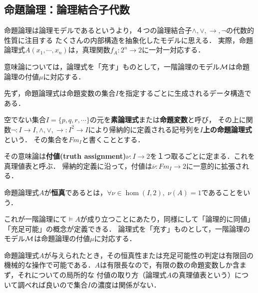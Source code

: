 \documentclass[uplatex, 12pt, dvipdfmx]{jsreport}
\begin{document}
\subsection{命題論理：論理結合子代数}

\begin{screen}
命題論理は論理モデルであるというより，４つの論理結合子$\land,\lor,\to,\lnot$の代数的性質に注目する
たくさんの内部構造を抽象化したモデルに思える．
実際，命題論理式$A(x_1,\cdots,x_n)$は，真理関数$f_A:2^n\to 2$に一対一対応する．

意味論については，論理式を「充す」ものとして，一階論理のモデル$\mathcal{M}$は命題論理の付値$\mu$に対応する．
\end{screen}

先ず，命題論理式は命題変数の集合$I$を指定するごとに生成されるデータ構造である．
\begin{definition}
    空でない集合$I=\{p,q,r,\cdots\}$の元を\textbf{素論理式}または\textbf{命題変数}と呼び，
    その上に関数$\lnot:I\to I,\land,\lor,\to:I^2\to I$により帰納的に定義される記号列を\textbf{$I$上の命題論理式}という．
    その集合を$Fm_I$と書くこととする．
\end{definition}

その意味論は\textbf{付値(truth assignment)}$\nu:I\to 2$を１つ取るごとに定まる．これを真理値表と呼ぶ．
帰納的定義に沿って，付値は$\overline{\nu}:Fm_I\to 2$に一意的に拡張される．

\begin{definition}[tautology]
    命題論理式$A$が\textbf{恒真}であるとは，$\forall\nu\in\hom(I,2),\;\nu(A)=1$であることをいう．
\end{definition}
これが一階論理にて$\vDash A$が成り立つことにあたり，同様にして「論理的に同値」「充足可能」の概念が定義できる．
論理式を「充す」ものとして，一階論理のモデル$\mathcal{M}$は命題論理の付値$\mu$に対応する．

\begin{remark}
    命題論理式$A$が与えられたとき，その恒真性または充足可能性の判定は有限回の機械的な操作で可能である．$A$は有限長なので，有限の数の命題変数しか含まず，それについての局所的な
    付値の取り方（論理式$A$の真理値表という）について調べれば良いので集合$I$の濃度は関係がない．
\end{remark}
\end{document}
